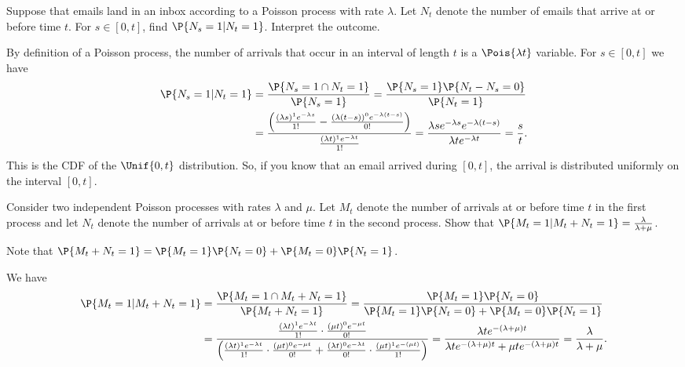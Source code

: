 	\begin{exercise}
		Suppose that emails land in an inbox according to a Poisson process with rate $\lambda$. Let $N_t$ denote the number of emails that arrive at or before time $t$. For $s \in [0,t]$, find $\P{N_s = 1 | N_t = 1}$. Interpret the outcome.
		\begin{solution}
			By definition of a Poisson process, the number of arrivals that occur in an interval of length $t$ is a $\Pois{\lambda t}$ variable. For $s \in [0,t]$ we have
			\begin{align*}
				\P{N_s = 1 | N_t = 1} & = \frac{\P{N_s = 1 \cap N_t = 1}}{\P{N_s = 1}} = \frac{\P{N_s = 1} \P{N_t - N_s = 0}}{\P{N_t = 1}} \\
				& = \frac{\left(\frac{(\lambda s)^1 e^{-\lambda s}}{1!} - \frac{(\lambda (t - s))^0 e^{-\lambda (t - s)}}{0!}\right)}{\frac{(\lambda t)^1 e^{-\lambda t}}{1!}} = \frac{\lambda s e^{- \lambda s} e^{-\lambda (t - s)}}{\lambda t e^{- \lambda t}} = \frac{s}{t}.
			\end{align*}
			This is the CDF of the $\Unif{0,t}$ distribution. So, if you know that an email arrived during $[0, t]$, the arrival is distributed uniformly on the interval $[0, t]$.
		\end{solution}
	\end{exercise}
	
	\begin{exercise}
		Consider two independent Poisson processes with rates $\lambda$ and $\mu$. Let $M_t$ denote the number of arrivals at or before time $t$ in the first process and let $N_t$ denote the number of arrivals at or before time $t$ in the second process. Show that $\P{M_t = 1 | M_t + N_t = 1} = \frac{\lambda}{\lambda + \mu}$.
		\begin{hint}
			Note that $\P{M_t + N_t = 1} = \P{M_t = 1} \P{N_t = 0} + \P{M_t = 0} \P{N_t = 1}$.
		\end{hint}

		\begin{solution}
			We have
			\begin{align*}
				\P{M_t = 1 | M_t + N_t = 1} & = \frac{\P{M_t = 1 \cap M_t + N_t = 1}}{\P{M_t + N_t = 1}} = \frac{\P{M_t = 1} \P{N_t = 0}}{\P{M_t = 1} \P{N_t = 0} + \P{M_t = 0} \P{N_t = 1}} \\
				& = \frac{\frac{(\lambda t)^1 e^{- \lambda t}}{1!} \cdot \frac{(\mu t)^0 e^{- \mu t}}{0!}}{\left(\frac{(\lambda t)^1 e^{- \lambda t}}{1!} \cdot \frac{(\mu t)^0 e^{- \mu t}}{0!} + \frac{(\lambda t)^0 e^{- \lambda t}}{0!} \cdot \frac{(\mu t)^1 e^{- (\mu t)}}{1!}\right)} = \frac{\lambda t e^{- (\lambda + \mu)t}}{\lambda t e^{- (\lambda + \mu)t} + \mu t e^{- (\lambda + \mu)t}} = \frac{\lambda}{\lambda + \mu}.
			\end{align*}
		\end{solution}
	\end{exercise}



